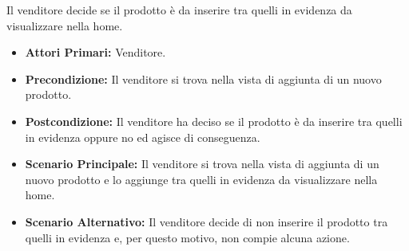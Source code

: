 Il venditore decide se il prodotto è da inserire tra quelli in evidenza da visualizzare nella home.
\begin{itemize}
    \item \textbf{Attori Primari:} Venditore.
    \item \textbf{Precondizione:} Il venditore si trova nella vista di aggiunta di un nuovo prodotto.
    \item \textbf{Postcondizione:} Il venditore ha deciso se il prodotto è da inserire tra quelli in evidenza oppure no ed agisce di conseguenza.
    \item \textbf{Scenario Principale:} Il venditore si trova nella vista di aggiunta di un nuovo prodotto e lo aggiunge tra quelli in evidenza da visualizzare nella home.
    \item \textbf{Scenario Alternativo:} Il venditore decide di non inserire il prodotto tra quelli in evidenza e, per questo motivo, non compie alcuna azione.
\end{itemize}



